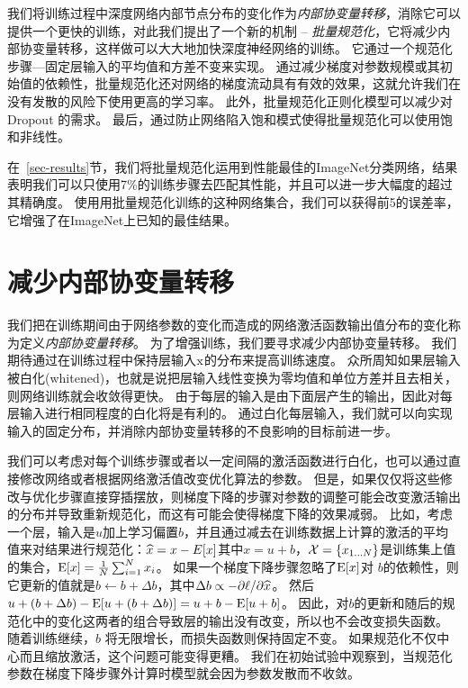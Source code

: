 \documentclass[twocolumn]{article}
\begin{document}
我们将训练过程中深度网络内部节点分布的变化作为{\em 内部协变量转移}，消除它可以提供一个更快的训练，对此我们提出了一个新的机制 -- {\em 批量规范化}，它将减少内部协变量转移，这样做可以大大地加快深度神经网络的训练。
它通过一个规范化步骤—固定层输入的平均值和方差不变来实现。
通过减少梯度对参数规模或其初始值的依赖性，批量规范化还对网络的梯度流动具有有效的效果，这就允许我们在没有发散的风险下使用更高的学习率。
此外，批量规范化正则化模型可以减少对Dropout \cite{dropout}的需求。
最后，通过防止网络陷入饱和模式使得批量规范化可以使用饱和非线性。

在~\ref{sec-results}节，我们将批量规范化运用到性能最佳的ImageNet分类网络，结果表明我们可以只使用7\%的训练步骤去匹配其性能，并且可以进一步大幅度的超过其精确度。
使用用批量规范化训练的这种网络集合，我们可以获得前5的误差率，它增强了在ImageNet上已知的最佳结果。

\section{减少内部\mbox{协变量}转移}

我们把在训练期间由于网络参数的变化而造成的网络激活函数输出值分布的变化称为定义{\em 内部协变量转移}。
为了增强训练，我们要寻求减少内部协变量转移。
我们期待通过在训练过程中保持层输入$\mathrm{x}$的分布来提高训练速度。
众所周知\cite{lecun-backprop,  loglinear-training}如果层输入被白化(whitened)，也就是说把层输入线性变换为零均值和单位方差并且去相关，则网络训练就会收敛得更快。
由于每层的输入是由下面层产生的输出，因此对每层输入进行相同程度的白化将是有利的。
通过白化每层输入，我们就可以向实现输入的固定分布，并消除内部协变量转移的不良影响的目标前进一步。

我们可以考虑对每个训练步骤或者以一定间隔的激活函数进行白化，也可以通过直接修改网络或者根据网络激活值改变优化算法的参数\cite{mean-normalized-sgd, raiko, povey,  desjardins}。
但是，如果仅仅将这些修改与优化步骤直接穿插摆放，则梯度下降的步骤对参数的调整可能会改变激活输出的分布并导致重新规范化，而这有可能会使得梯度下降的效果减弱。
比如，考虑一个层，输入是$u$加上学习偏置$b$，并且通过减去在训练数据上计算的激活的平均值来对结果进行规范化：$\widehat{x}=x - E[x]$其中$x = u+b$，$\mathcal{X}=\{x_{1\ldots N}\}$是训练集上值的集合，$ \text{E}[x] = \frac{1}{N}\sum_{i=1}^Nx_i$。
如果一个梯度下降步骤忽略了$\text{E}[x]$对 $b$的依赖性，则它更新的值就是$b\leftarrow b+\Delta b$，其中$\Delta b\propto -\partial{\ell}/\partial{\widehat{x}}$。
然后$u+(b+\Delta b) - \text{E}[u+(b+\Delta b)] = u+b-\text{E}[u+b]$。
因此，对$b$的更新和随后的规范化中的变化这两者的组合导致层的输出没有改变，所以也不会改变损失函数。
随着训练继续，$b$ 将无限增长，而损失函数则保持固定不变。
如果规范化不仅中心而且缩放激活，这个问题可能变得更糟。
我们在初始试验中观察到，当规范化参数在梯度下降步骤外计算时模型就会因为参数发散而不收敛。
\end{document}

